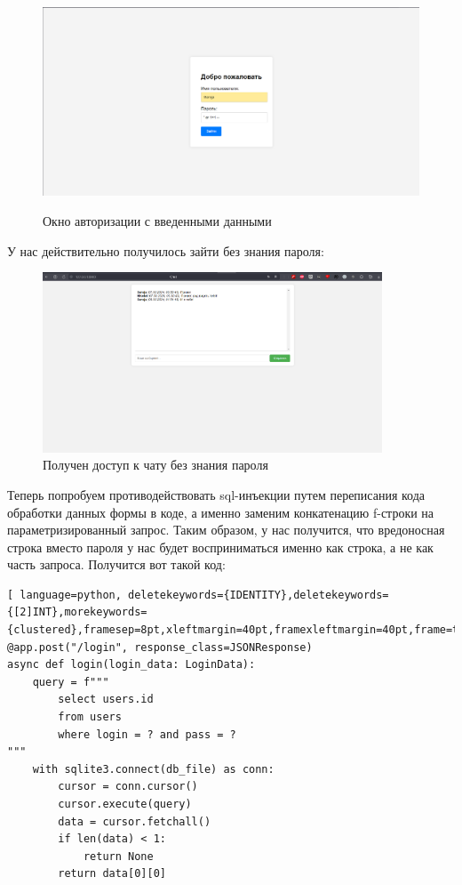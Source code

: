 \documentclass[a4paper,12pt]{diplom}
\begin{document}
	 \begin{figure}[!ht]
	 {\centering
	 \includegraphics[width=1\textwidth]{auth_sql_injection_attack.png}
	 \caption{Окно авторизации с введенными данными}\par\medskip
	 \label{fig:auth_sql_injection_attack} 
	 }
	\end{figure}
	У нас действительно получилось зайти без знания пароля:\par\bigskip
	\begin{figure}[!ht]
	 
	 {\centering
	 \includegraphics[width=0.9\textwidth]{chat_sql_injection_attack_success.png}
	 \caption{Получен доступ к чату без знания пароля}
	 \label{fig:chat_sql_injection_attack_success}
	 }
	 \end{figure}
	 \pagebreak
	 Теперь попробуем противодействовать sql-инъекции путем переписания кода обработки данных формы в коде, а именно заменим конкатенацию f-строки на параметризированный запрос. Таким образом, у нас получится, что вредоносная строка вместо пароля у нас будет восприниматься именно как строка, а не как часть запроса. Получится вот такой код:
	 
	 \begin{lstlisting}[ language=python, deletekeywords={IDENTITY},deletekeywords={[2]INT},morekeywords={clustered},framesep=8pt,xleftmargin=40pt,framexleftmargin=40pt,frame=tb,framerule=0pt]    
@app.post("/login", response_class=JSONResponse)
async def login(login_data: LoginData):
	query = f"""
	 	select users.id
	 	from users
	 	where login = ? and pass = ?
"""
	with sqlite3.connect(db_file) as conn:
		cursor = conn.cursor()
	 	cursor.execute(query)
	 	data = cursor.fetchall()
	 	if len(data) < 1:
	 		return None
	 	return data[0][0]
	 \end{lstlisting}
	 
\end{document}
